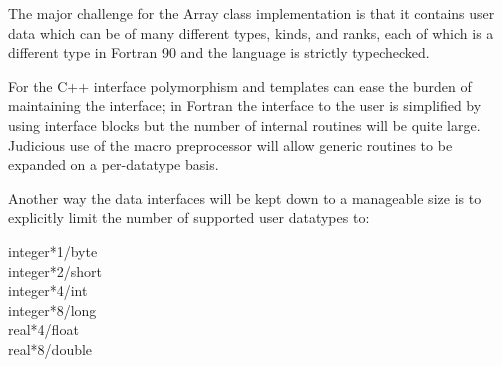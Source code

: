 \begin{enumerate}
The major challenge for the Array class implementation is that it 
contains user data which can be of many different types, kinds,
and ranks, each of which is a different type in Fortran 90 and
the language is strictly typechecked.

For the C++ interface polymorphism and templates can ease the burden of 
maintaining the interface; in Fortran the interface to the user
is simplified by using interface blocks but the number of internal
routines will be quite large.  Judicious use of the macro preprocessor
will allow generic routines to be expanded on a per-datatype basis.

Another way the data interfaces will be kept down to a manageable
size is to explicitly limit the number of supported user datatypes to:
\begin{description}
\item[integer*1/byte]
\item[integer*2/short]
\item[integer*4/int]
\item[integer*8/long]
\item[real*4/float]
\item[real*8/double]
\end{description}

\end{enumerate}





